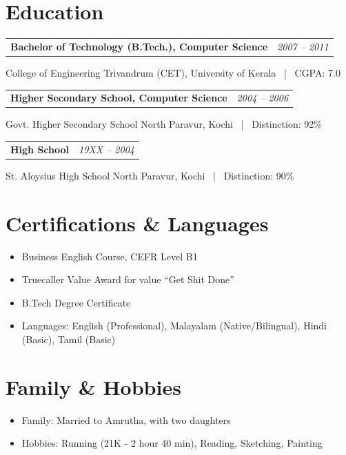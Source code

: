\documentclass[10.5pt,a4paper]{article}
\makeatletter
\newcommand{\eduentry}[4]{%
  \noindent
  \begin{tabular*}{\textwidth}{@{\extracolsep{\fill}}l r}
    \textbf{#1} & {\itshape\color{lightgray} #3} \\
  \end{tabular*}\par
  {\color{graytext} #2 \ | \ #4}\par\vspace{4pt}
}
\makeatother
\begin{document}
\section{Education}
\eduentry{Bachelor of Technology (B.Tech.), Computer Science}{College of Engineering Trivandrum (CET), University of Kerala}{2007 -- 2011}{CGPA: 7.0}
\eduentry{Higher Secondary School, Computer Science}{Govt. Higher Secondary School North Paravur, Kochi}{2004 -- 2006}{Distinction: 92\%}
\eduentry{High School}{St. Aloysius High School North Paravur, Kochi}{19XX -- 2004}{Distinction: 90\%}

\section{Certifications \& Languages}
\begin{itemize}[leftmargin=16pt, itemsep=1pt, topsep=2pt, parsep=0pt]
  \item Business English Course, CEFR Level B1
  \item Truecaller Value Award for value ``Get Shit Done''
  \item B.Tech Degree Certificate
  \item Languages: English (Professional), Malayalam (Native/Bilingual), Hindi (Basic), Tamil (Basic)
\end{itemize}

\section{Family \& Hobbies}
\begin{itemize}[leftmargin=16pt, itemsep=1pt, topsep=2pt, parsep=0pt]
  \item Family: Married to Amrutha, with two daughters
  \item Hobbies: Running (21K - 2 hour 40 min), Reading, Sketching, Painting
\end{itemize}
\end{document}
